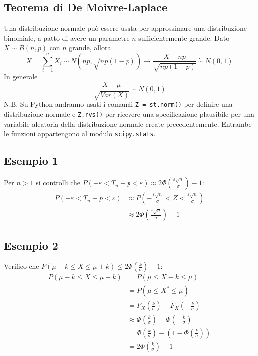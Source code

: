 \documentclass[11pt]{report}
\begin{document}
\subsection{Teorema di De Moivre-Laplace}
Una distribuzione normale può essere usata per approssimare una distribuzione binomiale, a patto di avere un parametro $n$ sufficientemente grande. Dato $X \sim B(n,p)$ con $n$ grande, allora
\begin{equation}
	X = \sum_{i=1}^n X_i\ \dot\sim\ N \left( np, \sqrt{np(1-p)} \right) \rightarrow \frac{X - np}{\sqrt{np(1-p)}}\ \dot\sim\ N(0,1)
\end{equation}
In generale
\begin{equation}
	\frac{X - \mu}{\sqrt{Var(X)}}\ \dot\sim\ N(0,1)
\end{equation}
N.B. Su Python andranno usati i comandi \texttt{Z = st.norm()} per definire una distribuzione normale e \texttt{Z.rvs()} per ricevere una specificazione plausibile per una variabile aleatoria della distribuzione normale create precedentemente. Entrambe le funzioni appartengono al modulo \texttt{scipy.stats}.
\subsection{Esempio 1}
Per $n>1$ si controlli che $P(-\varepsilon < T_n - p < \varepsilon) \approx 2\Phi \left( \frac{\varepsilon\sqrt{n}}{\sigma} \right) - 1$:
\begin{equation}
    \begin{split}
        P(-\varepsilon < T_n - p < \varepsilon) & \approx P \left( -\frac{\varepsilon\sqrt{n}}{\sigma} < Z < \frac{\varepsilon\sqrt{n}}{\sigma} \right)\\
        & \approx 2\Phi \left( \frac{\varepsilon\sqrt{n}}{\sigma} \right) - 1
    \end{split}
\end{equation}
\subsection{Esempio 2}
Verifico che $P(\mu-k \leq X \leq \mu+k) \leq 2\Phi \left( \frac{k}{\sigma} \right) - 1$:
\begin{equation}
    \begin{split}
        P(\mu-k \leq X \leq \mu+k) & = P(\mu \leq X-k \leq \mu)\\
        & = P(\mu \leq X^* \leq \mu)\\
        & = F_X \left( \frac{k}{\sigma} \right) - F_X \left( -\frac{k}{\sigma} \right)\\
        & \approx \Phi \left( \frac{k}{\sigma} \right) - \Phi \left( -\frac{k}{\sigma} \right)\\
        & = \Phi \left( \frac{k}{\sigma} \right) - \left( 1 - \Phi \left( \frac{k}{\sigma} \right) \right)\\
        & = 2\Phi \left( \frac{k}{\sigma} \right) - 1
    \end{split}
\end{equation}
\end{document}
